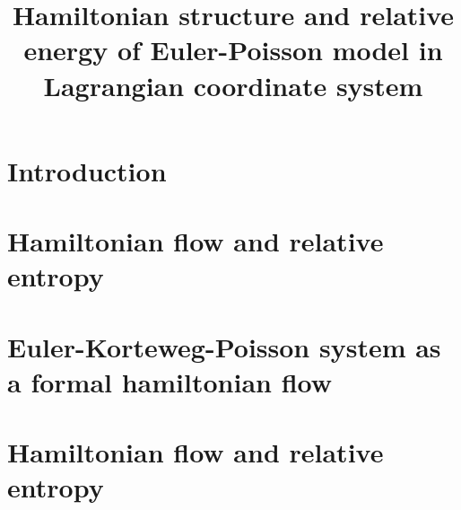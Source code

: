 \documentclass[10pt, letterpaper]{article}
\author{}
\date{}
\title{Hamiltonian structure and relative energy of Euler-Poisson model in Lagrangian coordinate system}
\theoremstyle{definition}
\theoremstyle{remark}
\begin{document}
\maketitle
\tableofcontents

\section{Introduction}

\section{Hamiltonian flow and relative entropy}



\section{Euler-Korteweg-Poisson system as a formal hamiltonian flow}

\section{Hamiltonian flow and relative entropy}
\end{document}

